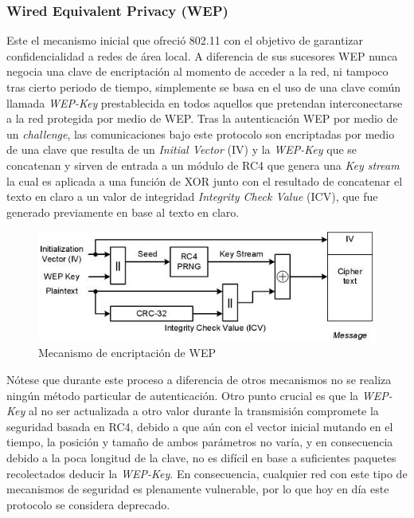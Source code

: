 \documentclass[10pt,a4paper]{article}
\begin{document}
\pagebreak

\subsubsection{Wired Equivalent Privacy (WEP)}

Este el mecanismo inicial que ofreció 802.11 con el objetivo de garantizar confidencialidad a redes de área local.
A diferencia de sus sucesores WEP nunca negocia una clave de encriptación al momento de acceder a la red, ni tampoco tras cierto periodo de tiempo, simplemente se basa en el uso de una clave común llamada \textit{WEP-Key} prestablecida en todos aquellos que pretendan interconectarse a la red protegida por medio de WEP. Tras la autenticación WEP por medio de un \textit{challenge}, las comunicaciones bajo este protocolo son encriptadas por medio de una clave que resulta de un \textit{Initial Vector} (IV) y la \textit{WEP-Key} que se concatenan y sirven de entrada a un módulo de RC4 que genera una \textit{Key stream} la cual es aplicada a una función de XOR junto con el resultado de concatenar el texto en claro a un valor de integridad \textit{Integrity Check Value} (ICV), que fue generado previamente en base al texto en claro.

\begin{figure}[H]
\centerline{\includegraphics[scale=0.7]{images/wep_mechanism.png}}
\caption{Mecanismo de encriptación de WEP}
\end{figure}

Nótese que durante este proceso a diferencia de otros mecanismos no se realiza ningún método particular de autenticación. Otro punto crucial es que la \textit{WEP-Key} al no ser actualizada a otro valor durante la transmisión compromete la seguridad basada en RC4, debido a que aún con el vector inicial mutando en el tiempo, la posición y tamaño de ambos parámetros no varía, y en consecuencia debido a la poca longitud de la clave, no es difícil en base a suficientes paquetes recolectados deducir la \textit{WEP-Key}. En consecuencia, cualquier red con este tipo de mecanismos de seguridad es plenamente vulnerable, por lo que hoy en día este protocolo se considera deprecado.
\end{document}
